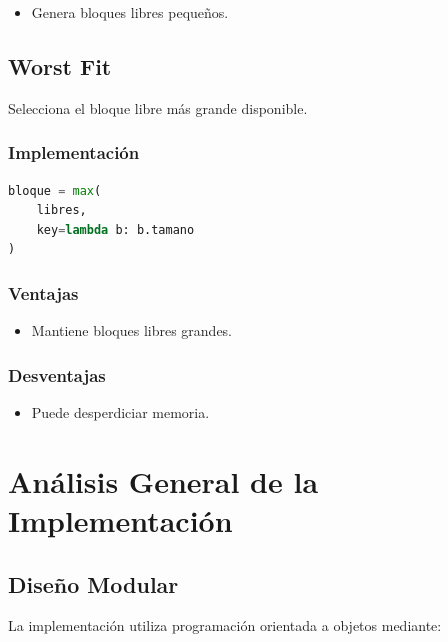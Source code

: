 \begin{itemize}
    \item Genera bloques libres pequeños.
\end{itemize}


\subsection{Worst Fit}

Selecciona el bloque libre más grande disponible.

\subsubsection{Implementación}

\begin{lstlisting}[language=Python]
bloque = max(
    libres,
    key=lambda b: b.tamano
)
\end{lstlisting}

\subsubsection{Ventajas}

\begin{itemize}
    \item Mantiene bloques libres grandes.
\end{itemize}

\subsubsection{Desventajas}

\begin{itemize}
    \item Puede desperdiciar memoria.
\end{itemize}


\section{Análisis General de la Implementación}

\subsection{Diseño Modular}

La implementación utiliza programación orientada a objetos mediante:

